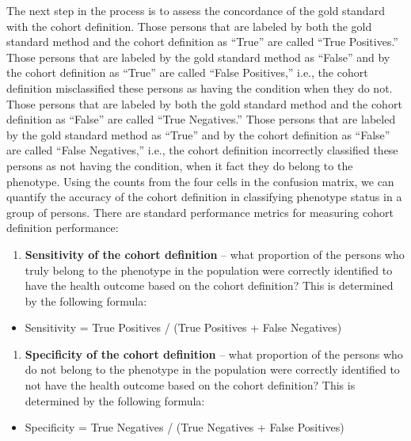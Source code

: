 \documentclass[
  letterpaper,
  paper=7in:10in,
  pagesize=pdftex,
  headinclude=on,
  footinclude=on,
  12pt]{scrbook}
\providecommand{\tightlist}{%
  \setlength{\itemsep}{0pt}\setlength{\parskip}{0pt}}\usepackage{longtable,booktabs,array}
\begin{document}
The next step in the process is to assess the concordance of the gold
standard with the cohort definition. Those persons that are labeled by
both the gold standard method and the cohort definition as ``True'' are
called ``True Positives.'' Those persons that are labeled by the gold
standard method as ``False'' and by the cohort definition as ``True''
are called ``False Positives,'' i.e., the cohort definition
misclassified these persons as having the condition when they do not.
Those persons that are labeled by both the gold standard method and the
cohort definition as ``False'' are called ``True Negatives.'' Those
persons that are labeled by the gold standard method as ``True'' and by
the cohort definition as ``False'' are called ``False Negatives,'' i.e.,
the cohort definition incorrectly classified these persons as not having
the condition, when it fact they do belong to the phenotype. Using the
counts from the four cells in the confusion matrix, we can quantify the
accuracy of the cohort definition in classifying phenotype status in a
group of persons. There are standard performance metrics for measuring
cohort definition performance:

\begin{enumerate}
\def\labelenumi{\arabic{enumi}.}
\tightlist
\item
  \textbf{Sensitivity of the cohort definition} -- what proportion of
  the persons who truly belong to the phenotype in the population were
  correctly identified to have the health outcome based on the cohort
  definition? This is determined by the following formula:
\end{enumerate}

\begin{itemize}
\tightlist
\item
  Sensitivity = True Positives / (True Positives + False Negatives)
\end{itemize}

\begin{enumerate}
\def\labelenumi{\arabic{enumi}.}
\tightlist
\item
  \textbf{Specificity of the cohort definition} -- what proportion of
  the persons who do not belong to the phenotype in the population were
  correctly identified to not have the health outcome based on the
  cohort definition? This is determined by the following formula:
\end{enumerate}

\begin{itemize}
\tightlist
\item
  Specificity = True Negatives / (True Negatives + False Positives)
\end{itemize}
\end{document}
